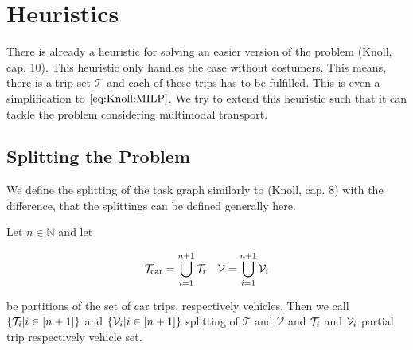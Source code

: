 \section{Heuristics}

There is already a heuristic for solving an easier version of the problem (Knoll, cap. 10). This heuristic only handles the case without costumers. This means, there is a trip set $\mathcal{T}$ and each of these trips has to be fulfilled. This is even a simplification to $\eqref{eq:Knoll:MILP}$. We try to extend this heuristic such that it can tackle the problem considering multimodal transport. 

\subsection{Splitting the Problem}

We define the splitting of the task graph similarly to (Knoll, cap. 8) with the difference, that the splittings can be defined generally here.

\begin{definition}[Splitting]
\label{def:splitting}

Let $n\in\mathbb{N}$ and let

\begin{align*}
	\mathcal{T}_{\operatorname{car}}=\bigcup_{i=1}^{n+1}\mathcal{T}_i && \mathcal{V}=\bigcup_{i=1}^{n+1}\mathcal{V}_i
\end{align*}

be partitions of the set of car trips, respectively vehicles. Then we call $\left\{\mathcal{T}_i|i\in[n+1]\right\}$ and $\left\{\mathcal{V}_i|i\in[n+1]\right\}$ splitting of $\mathcal{T}$ and $\mathcal{V}$ and $\mathcal{T}_i$ and $\mathcal{V}_i$ partial trip respectively vehicle set.

\end{definition}

